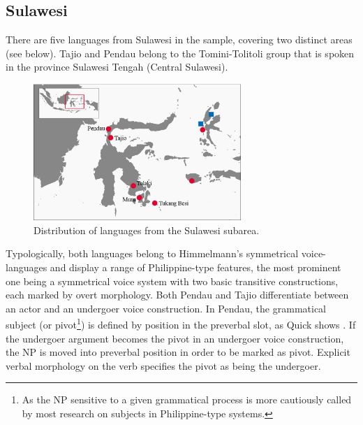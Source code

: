 \subsection{Sulawesi}

There are five languages from Sulawesi in the sample, covering two distinct areas (see  below). Tajio and Pendau belong to the Tomini-Tolitoli group that is spoken in the province Sulawesi Tengah (Central Sulawesi). 

\begin{figure}
\includegraphics[width=0.7\textwidth]{figures/Map_Sulawesi2.eps}
\caption{Distribution of languages from the Sulawesi subarea.}\label{map:Sul}

\end{figure}

Typologically, both languages belong to Himmelmann's symmetrical voice-languages and display a range of Philippine-type features, the most prominent one being a symmetrical voice system with two basic transitive constructions, each marked by overt morphology. Both Pendau and Tajio differentiate between an actor and an undergoer voice construction. In Pendau, the grammatical subject (or pivot\footnote{As the NP sensitive to a given grammatical process is more cautiously called by most research on subjects in Philippine-type systems.}) is defined by position in the preverbal slot, as Quick shows \citep[124]{Quick2007}. If the undergoer argument becomes the pivot in an undergoer voice construction, the NP is moved into preverbal position in order to be marked as pivot. Explicit verbal morphology on the verb specifies the pivot as being the undergoer.

